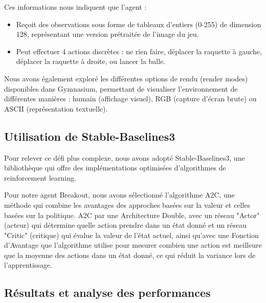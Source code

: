 \documentclass{article}
\begin{document}
Ces informations nous indiquent que l'agent :
\begin{itemize} 
    \item Reçoit des observations sous forme de tableaux d'entiers (0-255) de dimension 128, représentant une version prétraitée de l'image du jeu.
    \item Peut effectuer 4 actions discrètes : ne rien faire, déplacer la raquette à gauche, déplacer la raquette à droite, ou lancer la balle.
\end{itemize}

Nous avons également exploré les différentes options de rendu (render modes) disponibles dans Gymnasium, permettant de visualiser l'environnement de différentes manières : humain (affichage visuel), RGB (capture d'écran brute) ou ASCII (représentation textuelle).

\subsection{Utilisation de Stable-Baselines3}

\quad Pour relever ce défi plus complexe, nous avons adopté Stable-Baselines3, une bibliothèque qui offre des implémentations optimisées d'algorithmes de reinforcement learning.

Pour notre agent Breakout, nous avons sélectionné l'algorithme A2C, une méthode qui combine les avantages des approches basées sur la valeur et celles basées sur la politique. A2C par une Architecture Double, avec un réseau "Actor" (acteur) qui détermine quelle action prendre dans un état donné et un réseau "Critic" (critique) qui évalue la valeur de l'état actuel, ainsi qu'avec une Fonction d'Avantage que l'algorithme utilise pour mesurer combien une action est meilleure que la moyenne des actions dans un état donné, ce qui réduit la variance lors de l'apprentissage.

\subsection{Résultats et analyse des performances}
\end{document}

